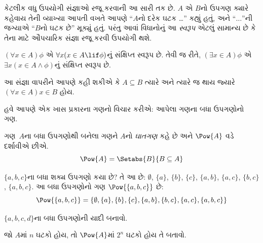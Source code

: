 કેટલીક વધુ ઉપયોગી સંજ્ઞાઓ રજૂ કરવાની આ સારી તક છે.
$A$ એ $B$નો ઉપગણ ક્યારે કહેવાય તેની વ્યાખ્યા આપતી વખતે આપણે
“$A$નો દરેક ઘટક \dots” કહ્યું હતું, અને “$\dots$”ની જગ્યાએ
“$B$નો ઘટક છે” મૂક્યું હતું.
પરંતુ આવાં વિધાનોનું આ \emph{સ્વરૂપ} એટલું સામાન્ય છે કે તેના માટે
ઔપચારિક સંજ્ઞા રજૂ કરવી ઉપયોગી થશે.

\begin{defn}
$(\forall x \in A)\phi$ એ $\forall x(x \in A \lif
\phi)$નું સંક્ષિપ્ત સ્વરૂપ છે. તેવી જ રીતે, $(\exists x \in A)\phi$
એ $\exists x(x \in A \land \phi)$નું સંક્ષિપ્ત સ્વરૂપ છે.
\end{defn}

આ સંજ્ઞા વાપરીને આપણે કહી શકીએ કે $A \subseteq B$ ત્યારે અને ત્યારે જ
થાય જ્યારે $(\forall x \in A)x \in B$ હોય.

હવે આપણે એક ખાસ પ્રકારના ગણનો વિચાર કરીએ: આપેલા ગણના બધા ઉપગણોનો ગણ.

\begin{defn}[ઘાતગણ]
ગણ~$A$ના બધા ઉપગણોથી બનેલા ગણને $A$નો \emph{ઘાતગણ} કહે છે
અને $\Pow{A}$ વડે દર્શાવીએ છીએ.
  \[
    \Pow{A} = \Setabs{B}{B \subseteq A}
  \]
\end{defn}

\begin{ex}
$\{ a, b, c \}$ના બધા શક્ય ઉપગણો કયા છે? તે આ છે:
$\emptyset$, $\{a \}$, $\{b\}$, $\{c\}$, $\{a, b\}$, $\{a, c\}$, $\{b,
c\}$, $\{a, b, c\}$. આ બધા ઉપગણોનો ગણ $\Pow{\{a,b,c\}}$ છે:
\[
\Pow{\{ a, b, c \}} = \{\emptyset, \{a \}, \{b\}, \{c\}, \{a, b\},
\{b, c\}, \{a, c\}, \{a, b, c\}\}
\]
\end{ex}

\begin{prob}
$\{a, b, c, d\}$ના બધા ઉપગણોની યાદી બનાવો.
\end{prob}

\begin{prob}
જો $A$માં $n$ ઘટકો હોય, તો $\Pow{A}$માં $2^n$
ઘટકો હોય તે બતાવો.
\end{prob}
\endgroup


\begingroup
\makeatletter{}\makeatother

\label{guunit:OLP-0007}


